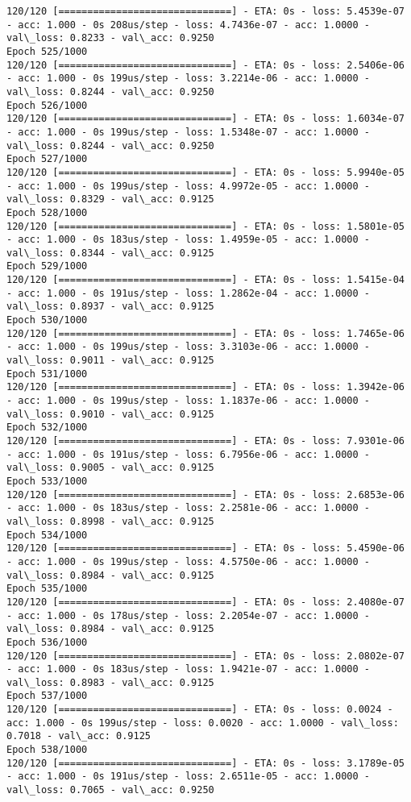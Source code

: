 \documentclass[11pt]{article}
\begin{document}
\begin{Verbatim}[commandchars=\\\{\}]
120/120 [==============================] - ETA: 0s - loss: 5.4539e-07 - acc: 1.000 - 0s 208us/step - loss: 4.7436e-07 - acc: 1.0000 - val\_loss: 0.8233 - val\_acc: 0.9250
Epoch 525/1000
120/120 [==============================] - ETA: 0s - loss: 2.5406e-06 - acc: 1.000 - 0s 199us/step - loss: 3.2214e-06 - acc: 1.0000 - val\_loss: 0.8244 - val\_acc: 0.9250
Epoch 526/1000
120/120 [==============================] - ETA: 0s - loss: 1.6034e-07 - acc: 1.000 - 0s 199us/step - loss: 1.5348e-07 - acc: 1.0000 - val\_loss: 0.8244 - val\_acc: 0.9250
Epoch 527/1000
120/120 [==============================] - ETA: 0s - loss: 5.9940e-05 - acc: 1.000 - 0s 199us/step - loss: 4.9972e-05 - acc: 1.0000 - val\_loss: 0.8329 - val\_acc: 0.9125
Epoch 528/1000
120/120 [==============================] - ETA: 0s - loss: 1.5801e-05 - acc: 1.000 - 0s 183us/step - loss: 1.4959e-05 - acc: 1.0000 - val\_loss: 0.8344 - val\_acc: 0.9125
Epoch 529/1000
120/120 [==============================] - ETA: 0s - loss: 1.5415e-04 - acc: 1.000 - 0s 191us/step - loss: 1.2862e-04 - acc: 1.0000 - val\_loss: 0.8937 - val\_acc: 0.9125
Epoch 530/1000
120/120 [==============================] - ETA: 0s - loss: 1.7465e-06 - acc: 1.000 - 0s 199us/step - loss: 3.3103e-06 - acc: 1.0000 - val\_loss: 0.9011 - val\_acc: 0.9125
Epoch 531/1000
120/120 [==============================] - ETA: 0s - loss: 1.3942e-06 - acc: 1.000 - 0s 199us/step - loss: 1.1837e-06 - acc: 1.0000 - val\_loss: 0.9010 - val\_acc: 0.9125
Epoch 532/1000
120/120 [==============================] - ETA: 0s - loss: 7.9301e-06 - acc: 1.000 - 0s 191us/step - loss: 6.7956e-06 - acc: 1.0000 - val\_loss: 0.9005 - val\_acc: 0.9125
Epoch 533/1000
120/120 [==============================] - ETA: 0s - loss: 2.6853e-06 - acc: 1.000 - 0s 183us/step - loss: 2.2581e-06 - acc: 1.0000 - val\_loss: 0.8998 - val\_acc: 0.9125
Epoch 534/1000
120/120 [==============================] - ETA: 0s - loss: 5.4590e-06 - acc: 1.000 - 0s 199us/step - loss: 4.5750e-06 - acc: 1.0000 - val\_loss: 0.8984 - val\_acc: 0.9125
Epoch 535/1000
120/120 [==============================] - ETA: 0s - loss: 2.4080e-07 - acc: 1.000 - 0s 178us/step - loss: 2.2054e-07 - acc: 1.0000 - val\_loss: 0.8984 - val\_acc: 0.9125
Epoch 536/1000
120/120 [==============================] - ETA: 0s - loss: 2.0802e-07 - acc: 1.000 - 0s 183us/step - loss: 1.9421e-07 - acc: 1.0000 - val\_loss: 0.8983 - val\_acc: 0.9125
Epoch 537/1000
120/120 [==============================] - ETA: 0s - loss: 0.0024 - acc: 1.000 - 0s 199us/step - loss: 0.0020 - acc: 1.0000 - val\_loss: 0.7018 - val\_acc: 0.9125
Epoch 538/1000
120/120 [==============================] - ETA: 0s - loss: 3.1789e-05 - acc: 1.000 - 0s 191us/step - loss: 2.6511e-05 - acc: 1.0000 - val\_loss: 0.7065 - val\_acc: 0.9250

\end{Verbatim}
\end{document}
